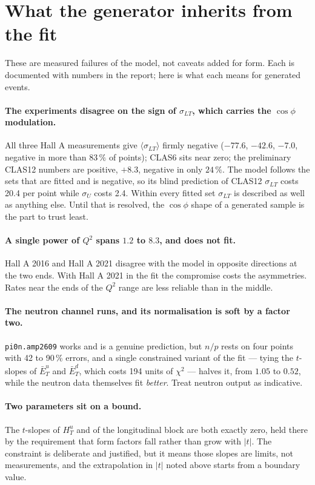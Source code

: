 \documentclass[11pt,a4paper]{article}
\newcommand{\sig}[1]{\sigma_{#1}}
\newcommand{\code}[1]{\texttt{#1}}
\begin{document}
\section{What the generator inherits from the fit}

These are measured failures of the model, not caveats added for form.  Each is
documented with numbers in the report; here is what each means for generated
events.

\paragraph{The experiments disagree on the sign of $\sig{LT}$, which carries
the $\cos\phi$ modulation.}  All three Hall A measurements give
$\langle\sig{LT}\rangle$ firmly negative ($-77.6$, $-42.6$, $-7.0$, negative in
more than $83\,\%$ of points); CLAS6 sits near zero; the preliminary CLAS12
numbers are positive, $+8.3$, negative in only $24\,\%$.  The model follows the
sets that are fitted and is negative, so its blind prediction of CLAS12
$\sig{LT}$ costs 20.4 per point while $\sig{U}$ costs 2.4.  Within every fitted
set $\sig{LT}$ is described as well as anything else.  Until that is resolved,
the $\cos\phi$ shape of a generated sample is the part to trust least.

\paragraph{A single power of $Q^2$ spans $1.2$ to $8.3$, and does not fit.}
Hall A 2016 and Hall A 2021 disagree with the model in opposite directions at the
two ends.  With Hall A 2021 in the fit the compromise costs the asymmetries.
Rates near the ends of the $Q^2$ range are less reliable than in the middle.

\paragraph{The neutron channel runs, and its normalisation is soft by a factor
two.}  \code{pi0n.amp2609} works and is a genuine prediction, but $n/p$ rests on
four points with 42 to 90\,\% errors, and a single constrained variant of the fit
--- tying the $t$-slopes of $\bar E_T^u$ and $\bar E_T^d$, which costs 194 units
of $\chi^2$ --- halves it, from $1.05$ to $0.52$, while the neutron data
themselves fit \emph{better}.  Treat neutron output as indicative.

\paragraph{Two parameters sit on a bound.}  The $t$-slopes of $H_T^u$ and of the
longitudinal block are both exactly zero, held there by the requirement that form
factors fall rather than grow with $|t|$.  The constraint is deliberate and
justified, but it means those slopes are limits, not measurements, and the
extrapolation in $|t|$ noted above starts from a boundary value.
\end{document}
